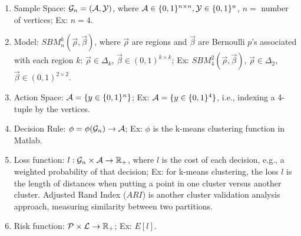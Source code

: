 \documentclass[12pt]{iopart}
\begin{document}

\begin{enumerate}
\item Sample Space:   ${\cal{G}}_n = ({\cal{A}},{\cal{Y}})$, where ${\cal{A}}\in\{0,1\}^{n\times n}, {\cal{Y}}\in\{0,1\}^n$, $n =$ number of vertices; Ex:  $n=4$. 
\item Model:  $SBM_{n}^{k}(\vec{\rho},\vec{\beta})$, where $\vec{\rho}$ are regions and $\vec{\beta}$ are Bernoulli $p$'s associated with each region $k$: $\vec{\rho}\in\Delta_{k}$, $\vec{\beta}\in(0,1)^{k\times k}$; Ex:  $SBM_{4}^{2}(\vec{\rho},\vec{\beta})$, $\vec{\rho}\in\Delta_{2}$, $\vec{\beta}\in(0,1)^{2\times 2}$.
\item Action Space:  ${\cal{A}} = \{y\in\{0,1\}^n\}$; Ex:  ${\cal{A}} = \{y\in\{0,1\}^4\}$, i.e., indexing a 4-tuple by the vertices. 
\item Decision Rule:  $\phi = \phi({\cal{G}}_n)\rightarrow \cal{A}$; Ex:  $\phi$ is the k-means clustering function in Matlab.
\item Loss function:  $l:  {\cal{G}}_n \times {\cal{A}}\rightarrow \mathbb{R}_+$, where $l$ is the cost of each decision, e.g., a weighted probability of that decision; Ex:  for k-means clustering, the loss $l$ is the length of distances when putting a point in one cluster versus another cluster.  Adjusted Rand Index ($ARI$) is another cluster validation analysis approach, measuring similarity between two partitions.
\item Risk function:  ${\cal{P}}\times{\cal{L}}\rightarrow\mathbb{R}_+$; Ex:  $E[l]$.
\end{enumerate}
\end{document}
